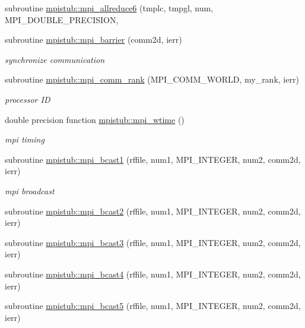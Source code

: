 \begin{DoxyCompactItemize}
\item 
subroutine \mbox{\hyperlink{namespacempistub_a3a34d1b95074e43d0c79295326059ef2}{mpistub\+::mpi\+\_\+allreduce6}} (tmplc, tmpgl, num, M\+P\+I\+\_\+\+D\+O\+U\+B\+L\+E\+\_\+\+P\+R\+E\+C\+I\+S\+I\+ON,
\item 
subroutine \mbox{\hyperlink{namespacempistub_a0d84064615f696d4877ad9f912d4cbef}{mpistub\+::mpi\+\_\+barrier}} (comm2d, ierr)
\begin{DoxyCompactList}\small\item\em synchronize communication \end{DoxyCompactList}\item 
subroutine \mbox{\hyperlink{namespacempistub_a3085e38e0e5d38df633afc7b2d92cebb}{mpistub\+::mpi\+\_\+comm\+\_\+rank}} (M\+P\+I\+\_\+\+C\+O\+M\+M\+\_\+\+W\+O\+R\+LD, my\+\_\+rank, ierr)
\begin{DoxyCompactList}\small\item\em processor ID \end{DoxyCompactList}\item 
double precision function \mbox{\hyperlink{namespacempistub_a2456432a60801629e19273ebe4114bc9}{mpistub\+::mpi\+\_\+wtime}} ()
\begin{DoxyCompactList}\small\item\em mpi timing \end{DoxyCompactList}\item 
subroutine \mbox{\hyperlink{namespacempistub_a28c2930a0c38a6318865ef760b6e87c0}{mpistub\+::mpi\+\_\+bcast1}} (rffile, num1, M\+P\+I\+\_\+\+I\+N\+T\+E\+G\+ER, num2, comm2d, ierr)
\begin{DoxyCompactList}\small\item\em mpi broadcast \end{DoxyCompactList}\item 
subroutine \mbox{\hyperlink{namespacempistub_a0d3b09e89256fef8bc0a4f71f7ff73c0}{mpistub\+::mpi\+\_\+bcast2}} (rffile, num1, M\+P\+I\+\_\+\+I\+N\+T\+E\+G\+ER, num2, comm2d, ierr)
\item 
subroutine \mbox{\hyperlink{namespacempistub_ae8d4cdea848159c537f06677e1d7b712}{mpistub\+::mpi\+\_\+bcast3}} (rffile, num1, M\+P\+I\+\_\+\+I\+N\+T\+E\+G\+ER, num2, comm2d, ierr)
\item 
subroutine \mbox{\hyperlink{namespacempistub_abe276f0cf456de80ee888e6b335a4b7d}{mpistub\+::mpi\+\_\+bcast4}} (rffile, num1, M\+P\+I\+\_\+\+I\+N\+T\+E\+G\+ER, num2, comm2d, ierr)
\item 
subroutine \mbox{\hyperlink{namespacempistub_a79437cd731fca94bcf720d8abd6cec77}{mpistub\+::mpi\+\_\+bcast5}} (rffile, num1, M\+P\+I\+\_\+\+I\+N\+T\+E\+G\+ER, num2, comm2d, ierr)

\end{DoxyCompactItemize}
